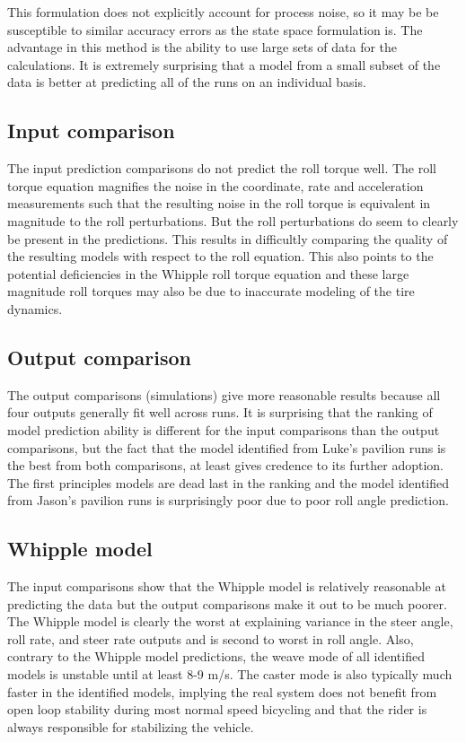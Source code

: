 \documentclass[a4paper]{article}
\begin{document}
This formulation does not explicitly account for process noise, so it may be be
susceptible to similar accuracy errors as the state space formulation is. %
The advantage in this method is the ability to use large sets of data for the
calculations. It is extremely surprising that a model from a small subset of
the data is better at predicting all of the runs on an individual basis.

\subsection{Input comparison}

The input prediction comparisons do not predict the roll torque well. The roll torque equation magnifies the noise in the coordinate,
rate and acceleration measurements such that the resulting noise in the roll
torque is equivalent in magnitude to the roll perturbations. But the roll
perturbations do seem to clearly be present in the predictions. This results in
difficultly comparing the quality of the resulting models with respect to the
roll equation. This also points to the potential deficiencies in the Whipple
roll torque equation and these large magnitude roll torques may also be due to
inaccurate modeling of the tire dynamics. %

\subsection{Output comparison}

The output comparisons (simulations) give more reasonable results because
all four outputs generally fit well across runs. It is surprising that the ranking of model prediction ability is
different for the input comparisons than the output comparisons, but the
fact that the model identified from Luke's pavilion runs is the best
from both comparisons, at least gives credence to its further adoption. %
The first principles models are dead last in the ranking and the model
identified from Jason's pavilion runs is surprisingly poor due to poor
roll angle prediction.

\subsection{Whipple model}

The input comparisons show that the Whipple model is relatively
reasonable at predicting the data but the output comparisons make it out
to be much poorer. The Whipple model is clearly the worst at explaining
variance in the steer angle, roll rate, and steer rate outputs and
is second to worst in roll angle. Also, contrary to the Whipple model
predictions, the weave mode of all identified models is unstable until
at least 8-9 m/s. The caster mode is also typically much faster in
the identified models, implying the real system does not
benefit from open loop stability during most normal speed
bicycling and that the rider is always responsible for stabilizing the
vehicle. 
\end{document}
